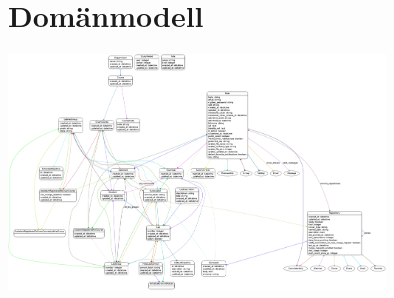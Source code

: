 \chapter{Domänmodell}
\centering
\begin{landscape}
\includegraphics[width=10.0cm]{fig/database/e-r-diagram.pdf}
\end{landscape}
